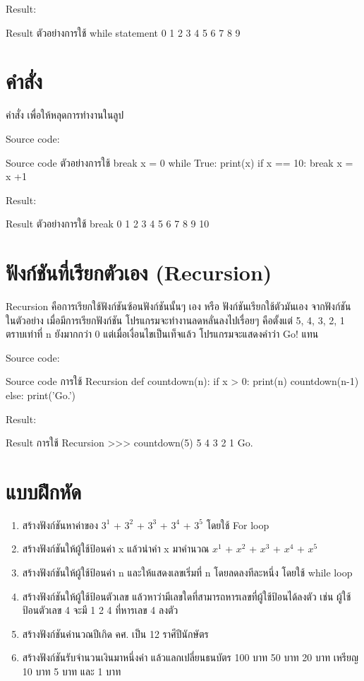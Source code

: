 Result:
\begin{codelist}{Result ตัวอย่างการใช้ while statement}{}
0
1
2
3
4
5
6
7
8
9
\end{codelist}

\section{คำสั่ง  }

คำสั่ง   เพื่อให้หลุดการทำงานในลูป

Source code:
\begin{codelist}{Source code ตัวอย่างการใช้ break}{}
x = 0
while True:
    print(x)
    if x == 10: break
    x = x +1
\end{codelist}

Result:
\begin{codelist}{Result ตัวอย่างการใช้ break}{}
0
1
2
3
4
5
6
7
8
9
10
\end{codelist}


\section{ฟังก์ชันที่เรียกตัวเอง (Recursion)}

Recursion คือการเรียกใช้ฟังก์ชันซ้อนฟังก์ชันนั้นๆ เอง หรือ ฟังก์ชันเรียกใช้ตัวมันเอง จากฟังก์ชัน   ในตัวอย่าง เมื่อมีการเรียกฟังก์ชัน   โปรแกรมจะทำงานลดหลั่นลงไปเรื่อยๆ คือตั้งแต่ 5, 4, 3, 2, 1 ตราบเท่าที่ n ยังมากกว่า 0 แต่เมื่อเงื่อนไขเป็นเท็จแล้ว โปรแกรมจะแสดงคำว่า Go! แทน

Source code:
\begin{codelist}{Source code  การใช้ Recursion}{}
def countdown(n):
    if x > 0:
        print(n)
        countdown(n-1)
    else:
        print('Go.')
\end{codelist}
Result:
\begin{codelist}{Result  การใช้ Recursion}{}
>>> countdown(5)
5
4
3
2
1
Go.
\end{codelist}


\section{แบบฝึกหัด}
\begin{enumerate} 

\item 	สร้างฟังก์ชันหาค่าของ  $3^1$ + $3^2$ + $3^3$ + $3^4$ + $3^5$  โดยใช้ For loop
\item 	สร้างฟังก์ชันให้ผู้ใช้ป้อนค่า x แล้วนำค่า x มาคำนวณ $x^1$ + $x^2$ + $x^3$ + $x^4$ + $x^5$
\item 	สร้างฟังก์ชันให้ผู้ใช้ป้อนค่า n และให้แสดงเลขเริ่มที่ n โดยลดลงทีละหนึ่ง โดยใช้ while loop
\item 	สร้างฟังก์ชันให้ผู้ใช้ป้อนตัวเลข แล้วหาว่ามีเลขใดที่สามารถหารเลขที่ผู้ใช้ป้อนได้ลงตัว เช่น ผู้ใช้ป้อนตัวเลข 4 จะมี 1 2 4 ที่หารเลข 4 ลงตัว
\item 	สร้างฟังก์ชันคำนวณปีเกิด คศ. เป็น 12 ราศีปีนักษัตร
\item 	สร้างฟังก์ชันรับจำนวนเงินมาหนึ่งค่า แล้วแลกเปลี่ยนธนบัตร 100 บาท 50 บาท 20 บาท เหรียญ 10 บาท 5 บาท และ 1 บาท
\end{enumerate}